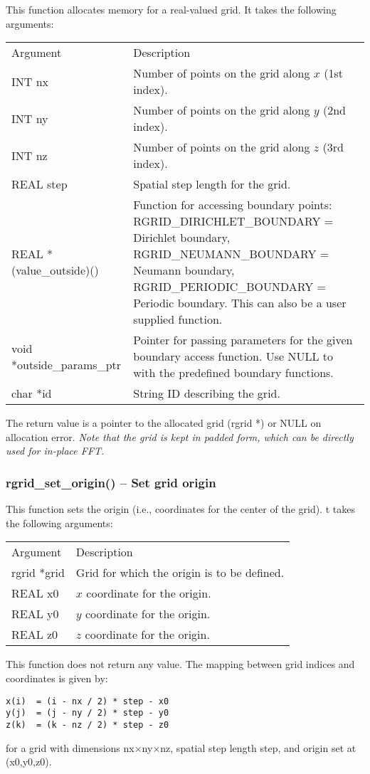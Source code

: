 \documentclass[12pt,letterpaper]{article}
\begin{document}
This function allocates memory for a real-valued grid. It takes the following arguments:
\begin{longtable}{p{} p{}}
Argument & Description\\
\cline{1-2}
INT nx & Number of points on the grid along $x$ (1st index).\\
INT ny & Number of points on the grid along $y$ (2nd index).\\
INT nz & Number of points on the grid along $z$ (3rd index).\\
REAL step & Spatial step length for the grid.\\
REAL *(value\_outside)() & Function for accessing boundary points: RGRID\_DIRICHLET\_BOUNDARY = Dirichlet boundary, RGRID\_NEUMANN\_BOUNDARY = Neumann boundary, RGRID\_PERIODIC\_BOUNDARY  = Periodic boundary. This can also be a user supplied function.\\
void *outside\_params\_ptr & Pointer for passing parameters for the given boundary access function. Use NULL to with the predefined boundary functions.\\
char *id & String ID describing the grid.
\end{longtable}
\noindent
The return value is a pointer to the allocated grid (rgrid *) or NULL on allocation error. \textit{Note that the grid is kept in padded form, which can be directly used for in-place FFT.}

\subsubsection{rgrid\_set\_origin() -- Set grid origin}

This function sets the origin (i.e., coordinates for the center of the grid). t takes the following arguments:
\begin{longtable}{p{} p{}}
Argument & Description\\
\cline{1-2}
rgrid *grid & Grid for which the origin is to be defined.\\
REAL x0 & $x$ coordinate for the origin.\\
REAL y0 & $y$ coordinate for the origin.\\
REAL z0 & $z$ coordinate for the origin.\\
\end{longtable}
\noindent
This function does not return any value. The mapping between grid indices and coordinates is given by:
\begin{verbatim}
x(i)  = (i - nx / 2) * step - x0
y(j)  = (j - ny / 2) * step - y0
z(k)  = (k - nz / 2) * step - z0
\end{verbatim}
for a grid with dimensions nx$\times$ny$\times$nz, spatial step length step, and origin set at (x0,y0,z0).
\end{document}
